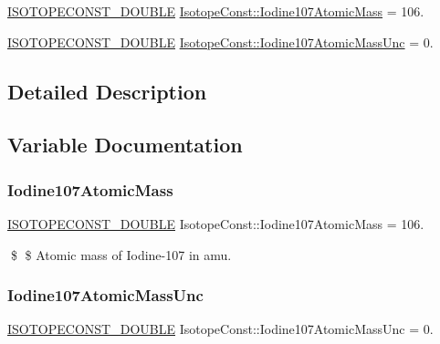 \begin{DoxyCompactItemize}
\item 
\mbox{\hyperlink{group___isotope_const-_macros_ga8f45a7272ce02c0b4c65c44636ed719a}{I\+S\+O\+T\+O\+P\+E\+C\+O\+N\+S\+T\+\_\+\+D\+O\+U\+B\+LE}} \mbox{\hyperlink{group___isotope_const-_iodine-_i107_ga866174a95f5f31216ac47476ed7331f8}{Isotope\+Const\+::\+Iodine107\+Atomic\+Mass}} = 106.
\item 
\mbox{\hyperlink{group___isotope_const-_macros_ga8f45a7272ce02c0b4c65c44636ed719a}{I\+S\+O\+T\+O\+P\+E\+C\+O\+N\+S\+T\+\_\+\+D\+O\+U\+B\+LE}} \mbox{\hyperlink{group___isotope_const-_iodine-_i107_ga86e3a9fa4704aa73d08e2f1833902308}{Isotope\+Const\+::\+Iodine107\+Atomic\+Mass\+Unc}} = 0.
\end{DoxyCompactItemize}


\subsection{Detailed Description}


\subsection{Variable Documentation}
\mbox{\label{group___isotope_const-_iodine-_i107_ga866174a95f5f31216ac47476ed7331f8}} 
\subsubsection{\texorpdfstring{Iodine107\+Atomic\+Mass}{Iodine107AtomicMass}}
{\footnotesize\ttfamily \mbox{\hyperlink{group___isotope_const-_macros_ga8f45a7272ce02c0b4c65c44636ed719a}{I\+S\+O\+T\+O\+P\+E\+C\+O\+N\+S\+T\+\_\+\+D\+O\+U\+B\+LE}} Isotope\+Const\+::\+Iodine107\+Atomic\+Mass = 106.}

\$ \$ Atomic mass of Iodine-\/107 in amu. \mbox{\label{group___isotope_const-_iodine-_i107_ga86e3a9fa4704aa73d08e2f1833902308}} 
\subsubsection{\texorpdfstring{Iodine107\+Atomic\+Mass\+Unc}{Iodine107AtomicMassUnc}}
{\footnotesize\ttfamily \mbox{\hyperlink{group___isotope_const-_macros_ga8f45a7272ce02c0b4c65c44636ed719a}{I\+S\+O\+T\+O\+P\+E\+C\+O\+N\+S\+T\+\_\+\+D\+O\+U\+B\+LE}} Isotope\+Const\+::\+Iodine107\+Atomic\+Mass\+Unc = 0.}

